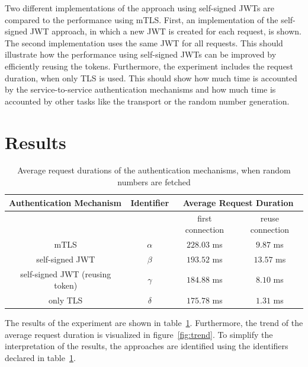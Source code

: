 Two different implementations of the approach using self-signed JWTs are compared to the performance using mTLS.
First, an implementation of the self-signed JWT approach, in which a new JWT is created for each request, is shown.
The second implementation uses the same JWT for all requests.
This should illustrate how the performance using self-signed JWTs can be improved by efficiently reusing the tokens.
Furthermore, the experiment includes the request duration, when only TLS is used.
This should show how much time is accounted by the service-to-service authentication mechanisms and how much time is accounted by other tasks like the transport or the random number generation.

\section{Results}

\begin{table}[H]
	\centering
\begin{tabular}{c|c|cc}
	\multicolumn{1}{l|}{\textbf{Authentication Mechanism}} & \textbf{Identifier} & \multicolumn{2}{c}{\textbf{Average Request Duration}} \\ \hline
	\multicolumn{1}{c|}{} & & \multicolumn{1}{c|}{first connection} & reuse connection \\ \hline
	mTLS & $\alpha$ & \multicolumn{1}{c|}{$228.03$ ms} & $9.87$ ms \\ \hline
	self-signed JWT & $\beta$ & \multicolumn{1}{c|}{$193.52$ ms} & $13.57$ ms \\ \hline
	self-signed JWT (reusing token) & $\gamma$ & \multicolumn{1}{c|}{$184.88$ ms} & $8.10$ ms \\ \hline 
	only TLS & $\delta$ & \multicolumn{1}{c|}{$175.78$ ms} & $1.31$ ms
\end{tabular}
\caption{Average request durations of the authentication mechanisms, when random numbers are fetched}
\label{tab:experiment_case_1}
\end{table}

The results of the experiment are shown in table~\ref{tab:experiment_case_1}.
Furthermore, the trend of the average request duration is visualized in figure~\ref{fig:trend}.
To simplify the interpretation of the results, the approaches are identified using the identifiers declared in table~\ref{tab:experiment_case_1}.


